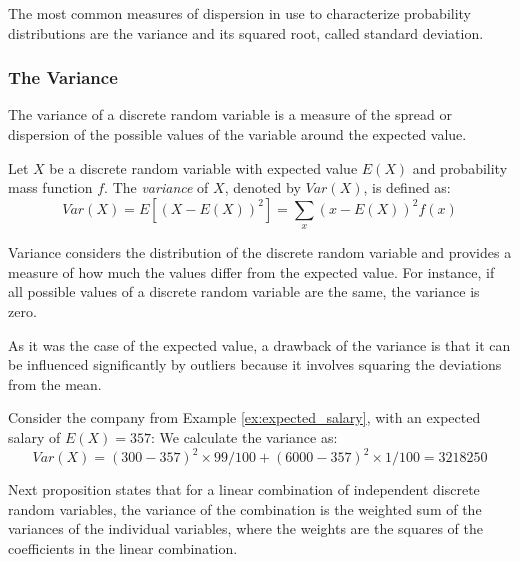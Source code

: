 The most common measures of dispersion in use to characterize probability distributions are the variance and its squared root, called standard deviation.


\subsubsection*{The Variance}

The variance of a discrete random variable is a measure of the spread or dispersion of the possible values of the variable around the expected value.

\begin{definition}
Let $X$ be a discrete random variable with expected value $E(X)$ and probability mass function $f$. The \emph{variance} of $X$, denoted by $Var(X)$, is defined as:
\[
Var(X) = E[(X - E(X))^2] = \sum_{x} (x - E(X))^2 f(x)
\]
\end{definition}

Variance considers the distribution of the discrete random variable and provides a measure of how much the values differ from the expected value. For instance, if all possible values of a discrete random variable are the same, the variance is zero.

As it was the case of the expected value, a drawback of the variance is that it can be influenced significantly by outliers because it involves squaring the deviations from the mean.

\begin{example}
Consider the company from Example \ref{ex:expected_salary}, with an expected salary of $E(X) = 357$: We calculate the variance as:
\[
Var(X) = (300 - 357)^2 \times 99/100 + (6000 - 357)^2 \times 1/100 = 3218250
\]
\end{example}

Next proposition states that for a linear combination of independent discrete random variables, the variance of the combination is the weighted sum of the variances of the individual variables, where the weights are the squares of the coefficients in the linear combination.

